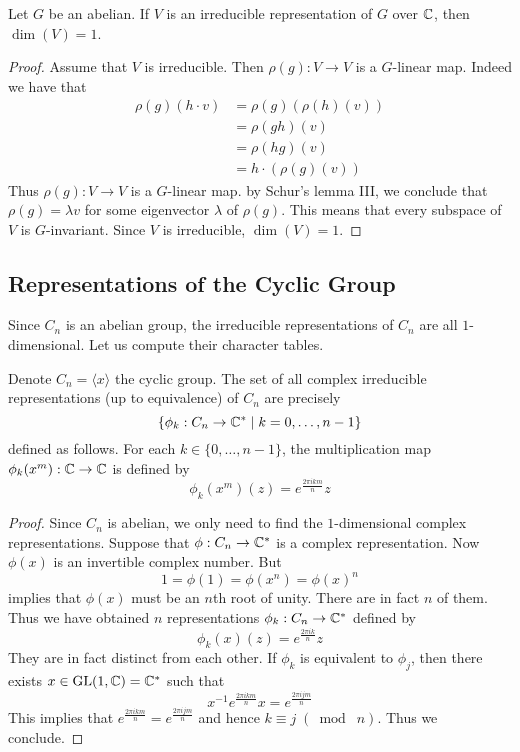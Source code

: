 \documentclass[a4paper]{article}
\begin{document}
\begin{thm}{}{} Let $G$ be an abelian. If $V$ is an irreducible representation of $G$ over $\mathbb{C}$, then $\dim(V)=1$. \tcbline
\begin{proof}
Assume that $V$ is irreducible. Then $\rho(g):V\to V$ is a $G$-linear map. Indeed we have that 
\begin{align*}
\rho(g)(h\cdot v)&=\rho(g)(\rho(h)(v))\\
&=\rho(gh)(v)\\
&=\rho(hg)(v)\\
&=h\cdot(\rho(g)(v))
\end{align*}
Thus $\rho(g):V\to V$ is a $G$-linear map. by Schur's lemma III, we conclude that $\rho(g)=\lambda v$ for some eigenvector $\lambda$ of $\rho(g)$. This means that every subspace of $V$ is $G$-invariant. Since $V$ is irreducible, $\dim(V)=1$. 
\end{proof}
\end{thm}

\subsection{Representations of the Cyclic Group}
Since $C_n$ is an abelian group, the irreducible representations of $C_n$ are all $1$-dimensional. Let us compute their character tables. 

\begin{thm}{}{} Denote $C_n=\langle x\rangle$ the cyclic group. The set of all complex irreducible representations (up to equivalence) of $C_n$ are precisely $$\{\phi_k:C_n\to\mathbb{C}^\ast\;|\;k=0,\dots,n-1\}$$ defined as follows. For each $k\in\{0,\dots,n-1\}$, the multiplication map $\phi_k(x^m):\mathbb{C}\to\mathbb{C}$ is defined by $$\phi_k(x^m)(z)=e^{\frac{2\pi ikm}{n}}z$$ \tcbline
\begin{proof}
Since $C_n$ is abelian, we only need to find the $1$-dimensional complex representations. Suppose that $\phi:C_n\to\mathbb{C}^\ast$ is a complex representation. Now $\phi(x)$ is an invertible complex number. But $$1=\phi(1)=\phi(x^n)=\phi(x)^n$$ implies that $\phi(x)$ must be an $n$th root of unity. There are in fact $n$ of them. Thus we have obtained $n$ representations $\phi_k:C_n\to\mathbb{C}^\ast$ defined by $$\phi_k(x)(z)=e^{\frac{2\pi ik}{n}}z$$ They are in fact distinct from each other. If $\phi_k$ is equivalent to $\phi_j$, then there exists $x\in\text{GL}(1,\mathbb{C})=\mathbb{C}^\ast$ such that $$x^{-1}e^{\frac{2\pi ikm}{n}}x=e^{\frac{2\pi ijm}{n}}$$ This implies that $e^{\frac{2\pi ikm}{n}}=e^{\frac{2\pi ijm}{n}}$ and hence $k\equiv j\;(\bmod\;n)$. Thus we conclude. 
\end{proof}
\end{thm}
\end{document}
